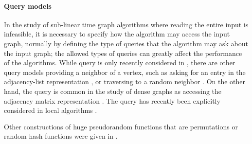 \paragraph*{Query models}
In the study of sub-linear time graph algorithms where reading the entire input is infeasible,
it is necessary to specify how the algorithm may access the input graph,
normally by defining the type of queries that the algorithm may ask about the input graph;
the allowed types of queries 
can greatly affect the performance of the algorithms.
While  query is only recently considered in \cite{reut},
there are other query models providing a neighbor of a vertex,
such as asking for an entry in the adjacency-list representation \cite{goldreich1997property},
or traversing to a random neighbor \cite{brautbar2010local}. On the other hand,
the
 query is common in the study of dense graphs as accessing the adjacency matrix representation \cite{goldreich1998property}.
The  query has recently been explicitly considered in local algorithms \cite{feige2017probe}.

Other constructions of huge pseudorandom functions that are permutations or random hash functions were given in \cite{luby_rackoff, naor, mansour}.

